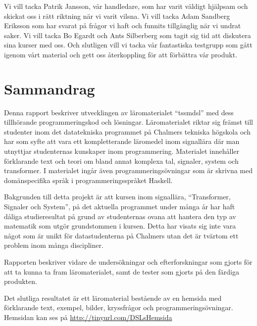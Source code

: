 \documentclass[12pt,a4paper,twoside,openright]{article}
\begin{document}
Vi vill tacka Patrik Jansson, vår handledare, som har varit väldigt
hjälpsam och skickat oss i rätt riktning när vi varit vilsna. Vi vill
tacka Adam Sandberg Eriksson som har svarat på frågor vi haft och
funnits tillgänglig när vi undrat saker. Vi vill tacka Bo Egardt och
Ants Silberberg som tagit sig tid att diskutera sina kurser med
oss. Och slutligen vill vi tacka vår fantastiska testgrupp som gått
igenom vårt material och gett oss återkoppling för att förbättra vår
produkt.

\newpage

\thispagestyle{plain}

\section*{Sammandrag}
Denna rapport beskriver utvecklingen av läromaterialet ``\gls{tssmdsl}''
med dess tillhörande programmeringskod och lösningar. Läromaterialet
riktar sig främst till studenter inom det datatekniska programmet på
Chalmers tekniska högskola och har som syfte att vara ett
kompletterande läromedel inom signallära där man utnyttjar
studenternas kunskaper inom programmering. Materialet innehåller
förklarande text och teori om bland annat komplexa tal, signaler,
system och transformer. I materialet ingår även programmeringsövningar
som är skrivna med domänspecifika språk i programmeringsspråket
\gls{Haskell}.

Bakgrunden till detta projekt är att kursen inom signallära,
``Transformer, Signaler och System'', på det aktuella programmet under
många år har haft dåliga studieresultat på grund av studenternas ovana
att hantera den typ av matematik som utgör grundstommen i
kursen. Detta har visats sig inte vara något som är unikt för
datastudenterna på Chalmers utan det är tvärtom ett problem inom många
discipliner.

Rapporten beskriver vidare de undersökningar och efterforskningar som
gjorts för att ta kunna ta fram läromaterialet, samt de tester som
gjorts på den färdiga produkten.

Det slutliga resultatet är ett läromaterial bestående av en hemsida med
förklarande text, exempel,  bilder, kryssfrågor och programmeringsövningar.
 Hemsidan kan ses på \url{http://tinyurl.com/DSLsHemsida}
\end{document}
